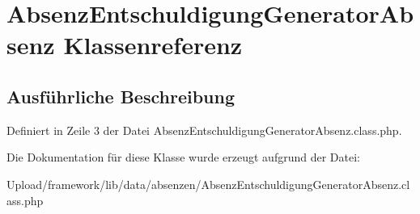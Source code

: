 \hypertarget{class_absenz_entschuldigung_generator_absenz}{}\section{Absenz\+Entschuldigung\+Generator\+Absenz Klassenreferenz}
\label{class_absenz_entschuldigung_generator_absenz}


\subsection{Ausführliche Beschreibung}


Definiert in Zeile 3 der Datei Absenz\+Entschuldigung\+Generator\+Absenz.\+class.\+php.



Die Dokumentation für diese Klasse wurde erzeugt aufgrund der Datei\+:\begin{DoxyCompactItemize}
\item 
Upload/framework/lib/data/absenzen/Absenz\+Entschuldigung\+Generator\+Absenz.\+class.\+php\end{DoxyCompactItemize}
